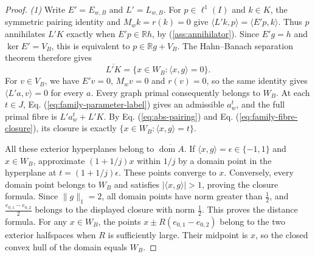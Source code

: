 \documentclass[11pt]{article}
\newcommand{\R}{\mathbb R}
\newcommand{\dom}{\operatorname{dom}}
\newcommand{\pair}[2]{\langle #1,#2\rangle}
\theoremstyle{definition}
\theoremstyle{remark}
\begin{document}
\begin{proof}
\noindent\textit{(1)} Write $E'=E_{w,B}$ and $L'=L_{w,B}$. For $p\in\ell^1(I)$ and $k\in K$, the symmetric pairing identity and $M_wk=r(k)=0$ give $\pair{L'k}{p}=\pair{E'p}{k}$. Thus $p$ annihilates $L'K$ exactly when $E'p\in\R h$, by \textup{(\ref{ass:annihilator})}. Since $E'g=h$ and $\ker E'=V_B$, this is equivalent to $p\in\R g+V_B$. The Hahn--Banach separation theorem therefore gives
\begin{equation}
\overline{L'K}=\{x\in W_B:\pair{x}{g}=0\}.
\label{eq:family-fibre-closure}
\end{equation}
For $v\in V_B$, we have $E'v=0$, $M_wv=0$ and $r(v)=0$, so the same identity gives $\pair{L'a}{v}=0$ for every $a$. Every graph primal consequently belongs to $W_B$. At each $t\in J$, Eq. (\ref{eq:family-parameter-label}) gives an admissible $a_w^t$, and the full primal fibre is $L'a_w^t+L'K$. By Eq. (\ref{eq:abs-pairing}) and Eq. (\ref{eq:family-fibre-closure}), its closure is exactly $\{x\in W_B:\pair{x}{g}=t\}$.

All these exterior hyperplanes belong to $\overline{\dom A}$. If $\pair{x}{g}=\epsilon\in\{-1,1\}$ and $x\in W_B$, approximate $(1+1/j)x$ within $1/j$ by a domain point in the hyperplane at $t=(1+1/j)\epsilon$. These points converge to $x$. Conversely, every domain point belongs to $W_B$ and satisfies $|\pair{x}{g}|>1$, proving the closure formula. Since $\|g\|_1=2$, all domain points have norm greater than $\frac12$, and $\frac{e_{0,1}-e_{0,2}}{2}$ belongs to the displayed closure with norm $\frac12$. This proves the distance formula. For any $x\in W_B$, the points $x\pm R(e_{0,1}-e_{0,2})$ belong to the two exterior halfspaces when $R$ is sufficiently large. Their midpoint is $x$, so the closed convex hull of the domain equals $W_B$.


\end{proof}
\end{document}
